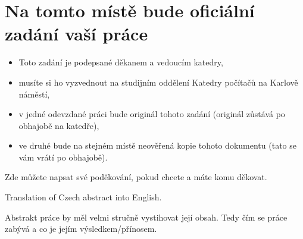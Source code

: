 \documentclass[11pt,twoside,a4paper]{book}
\begin{document}
	\translate				%

	{
	 \cleardoublepage \thispagestyle{empty}
	\chapter*{Na tomto místě bude oficiální zadání vaší práce}
	\begin{itemize}
		\item Toto zadání je podepsané děkanem a vedoucím katedry,
		\item musíte si ho vyzvednout na studijním oddělení Katedry počítačů na Karlově náměstí,
		\item v jedné odevzdané práci bude originál tohoto zadání (originál zůstává po obhajobě na katedře),
		\item ve druhé bude na stejném místě neověřená kopie tohoto dokumentu (tato se vám vrátí po obhajobě).
	\end{itemize}
	\newpage
	}

	\coverpagestarts


	\acknowledgements
	\noindent
	Zde můžete napsat své poděkování, pokud chcete a máte komu děkovat.






	\abstractpage

	Translation of Czech abstract into English.


	\baselineskip

	\noindent
	Abstrakt práce by měl velmi stručně vystihovat její obsah. Tedy čím se práce zabývá a co je jejím výsledkem/přínosem.
\end{document}
